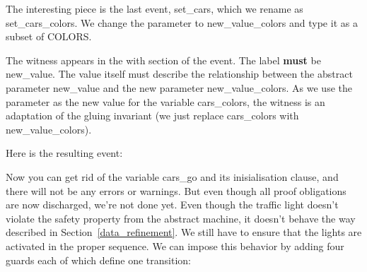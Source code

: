 The interesting piece is the last event, \textsf{set\_cars}, which we rename as \textsf{set\_cars\_colors}.  We change the parameter to \textsf{new\_value\_colors} and type it as a subset of \textsf{COLORS}.

The witness appears in the \textsf{with} section of the event.  The label \textbf{must} be \textsf{new\_value}.  The value itself must describe the relationship between the abstract parameter \textsf{new\_value} and the new parameter \textsf{new\_value\_colors}.  As we use the parameter as the new value for the variable \textsf{cars\_colors}, the witness is an adaptation of the gluing invariant (we just replace \textsf{cars\_colors} with \textsf{new\_value\_colors}).


Here is the resulting event:


Now you can get rid of the variable \textsf{cars\_go} and its inisialisation clause, and there will not be any errors or warnings. But even though all proof obligations are now discharged, we're not done yet. Even though the traffic light doesn't violate the safety property from the abstract machine, it doesn't behave the way described in Section~\ref{data_refinement}.  We still have to ensure that the lights are activated in the proper sequence.  We can impose this behavior by adding four guards each of which define one transition:


